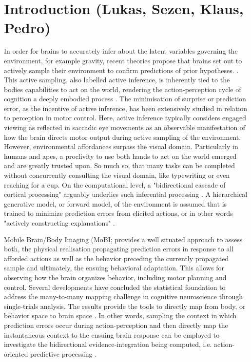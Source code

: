 \section{Introduction (Lukas, Sezen, Klaus, Pedro)}
In order for brains to accurately infer about the latent variables governing the environment, for example gravity, recent theories propose that brains set out to actively sample their environment to confirm predictions of prior hypotheses. \cites{Clark2013, Friston2010, Rao1999}. This active sampling, also labelled active inference, is inherently tied to the bodies capabilities to act on the world, rendering the action-perception cycle of cognition a deeply embodied process \cite{Friston2012}. The minimisation of surprise or prediction error, as the incentive of active inference, has been extensively studied in relation to perception in motor control. Here, active inference typically considers engaged viewing as reflected in saccadic eye movements as an observable manifestation of how the brain directs motor output during active sampling of the environment. However, environmental affordances surpass the visual domain. Particularly in humans and apes, a proclivity to use both hands to act on the world emerged and are greatly trusted upon. So much so, that many tasks can be completed without concurrently consulting the visual domain, like typewriting or even reaching for a cup. On the computational level, a "bidirectional cascade of cortical processing" arguably underlies such inferential processing \cite{Clark2013}. A hierarchical generative model, or forward model, of the environment is assumed that is trained to minimize prediction errors from elicited actions, or in other words "actively constructing explanations" \cites{Wolpert2011, Friston2018}. 

Mobile Brain/Body Imaging (MoBI; \cites{Gramann2011a, Gramann2014, Makeig2009} provides a well situated approach to assess both, the physical realisation propagating prediction errors in response to all afforded actions as well as the behavior preceding the currently propagated sample and ultimately, the ensuing behavioral adaptation. This allows for observing how the brain organizes behavior, including motor planning and control. Several developments have concluded the statistical foundation to address the many-to-many mapping challenge in cognitive neuroscience through single-trials analysis. The results provide the tools to directly map from body, or behavior space to brain space \cites{Pernet2011, Bridwell2018, Friston1994a, Blankertz2011}. In other words, sampling the context in which prediction errors occur during action-perception and then directly map the instantaneous context to the ensuing brain response can be employed to investigate the bidirectional evidence-integration being computed, i.e. action-oriented predictive processing \cite{Clark2013}.